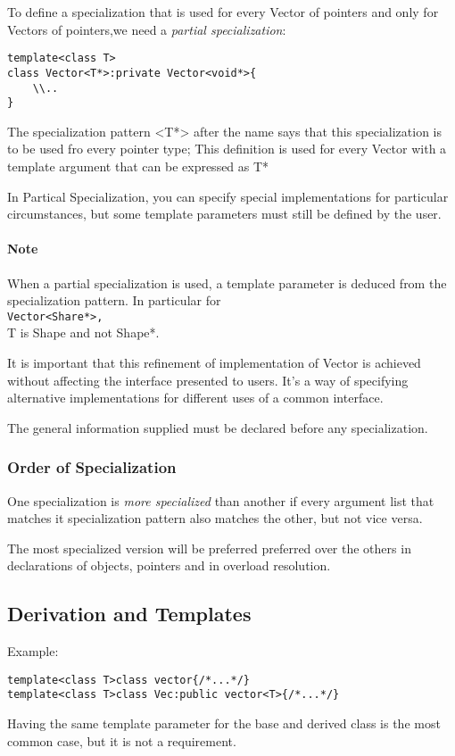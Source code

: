 \documentclass[a4paper,12pt]{book}
\begin{document}
To define a specialization that is used for every Vector of pointers and only for Vectors of pointers,we need a \emph{partial specialization}:
\begin{verbatim}
template<class T>
class Vector<T*>:private Vector<void*>{
    \\..
}
\end{verbatim}

The specialization pattern <T*> after the name says that this specialization is to be used fro every pointer type; This definition is used for every Vector with a template argument that can be expressed as T*

In Partical Specialization, you can specify special implementations for particular circumstances, but some template parameters must still be defined by the user.

\paragraph{Note} When a partial specialization is used, a template parameter is deduced from the specialization pattern. In particular for \\\verb|Vector<Share*>, |\\ T is Shape and not Shape*.

It is important that this refinement of implementation of Vector is achieved without affecting the interface presented to users. It's a way of specifying alternative implementations for different uses of a common interface.

The general information supplied must be declared before any specialization.

\subsubsection{Order of Specialization}
One specialization is \emph{more specialized} than another if every argument list that matches it specialization pattern also matches the other, but not vice versa.

The most specialized version will be preferred preferred over the others in declarations of objects, pointers and in overload resolution.
\subsection{Derivation and Templates}
Example:
\begin{verbatim}
template<class T>class vector{/*...*/}
template<class T>class Vec:public vector<T>{/*...*/}
\end{verbatim}
Having the same template parameter for the base and derived class is the most common case, but it is not a requirement. 
\end{document}
